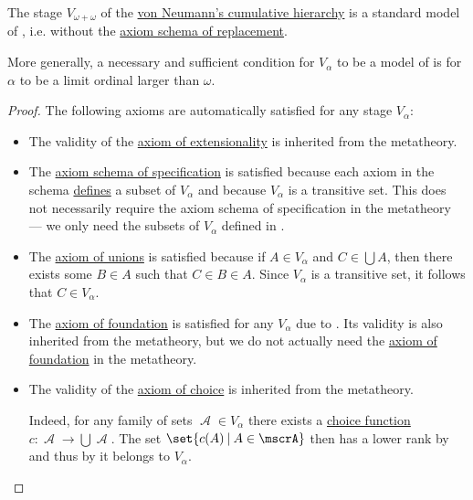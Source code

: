 \begin{theorem}[Model of Z]\label{thm:cumulative_hierarchy_model_of_z}
  The stage \( V_{\omega + \omega} \) of the \hyperref[def:cumulative_hierarchy]{von Neumann's cumulative hierarchy} is a standard model of , i.e.  without the \hyperref[def:zfc/replacement]{axiom schema of replacement}.

  More generally, a necessary and sufficient condition for \( V_\alpha \) to be a model of  is for \( \alpha \) to be a limit ordinal larger than \( \omega \).
\end{theorem}
\begin{proof}
  The following axioms are automatically satisfied for any stage \( V_\alpha \):
  \begin{itemize}
    \item The validity of the \hyperref[def:zfc/extensionality]{axiom of extensionality} is inherited from the metatheory.

    \item The \hyperref[def:zfc/specification]{axiom schema of specification} is satisfied because each axiom in the schema \hyperref[def:first_order_definability]{defines} a subset of \( V_\alpha \) and because \( V_\alpha \) is a transitive set. This does not necessarily require the axiom schema of specification in the metatheory --- we only need the subsets of \( V_\alpha \) defined in .

    \item The \hyperref[def:zfc/union]{axiom of unions} is satisfied because if \( A \in V_\alpha \) and \( C \in \bigcup A \), then there exists some \( B \in A \) such that \( C \in B \in A \). Since \( V_\alpha \) is a transitive set, it follows that \( C \in V_\alpha \).

    \item The \hyperref[def:zfc/foundation]{axiom of foundation} is satisfied for any \( V_\alpha \) due to . Its validity is also inherited from the metatheory, but we do not actually need the \hyperref[def:zfc/foundation]{axiom of foundation} in the metatheory.

    \item The validity of the \hyperref[def:zfc/choice]{axiom of choice} is inherited from the metatheory.

    Indeed, for any family of sets \( \mscrA \in V_\alpha \) there exists a \hyperref[def:choice_function]{choice function} \( c: \mscrA \to \bigcup \mscrA \). The set \( \set{ c(A) \given A \in \mscrA } \) then has a lower rank by  and thus by  it belongs to \( V_\alpha \).
  \end{itemize}


\end{proof}
